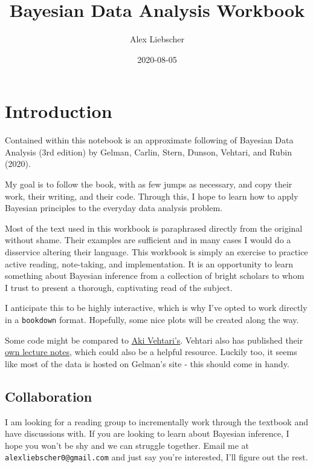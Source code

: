 \documentclass[]{book}
\title{Bayesian Data Analysis Workbook}
\author{Alex Liebscher}
\date{2020-08-05}
\begin{document}
\maketitle

{
\setcounter{tocdepth}{1}
\tableofcontents
}
\chapter{Introduction}\label{introduction}

Contained within this notebook is an approximate following of Bayesian
Data Analysis (3rd edition) by Gelman, Carlin, Stern, Dunson, Vehtari,
and Rubin (2020).

My goal is to follow the book, with as few jumps as necessary, and copy
their work, their writing, and their code. Through this, I hope to learn
how to apply Bayesian principles to the everyday data analysis problem.

Most of the text used in this workbook is paraphrased directly from the
original without shame. Their examples are sufficient and in many cases
I would do a disservice altering their language. This workbook is simply
an exercise to practice active reading, note-taking, and implementation.
It is an opportunity to learn something about Bayesian inference from a
collection of bright scholars to whom I trust to present a thorough,
captivating read of the subject.

I anticipate this to be highly interactive, which is why I've opted to
work directly in a \texttt{bookdown} format. Hopefully, some nice plots
will be created along the way.

Some code might be compared to
\href{https://github.com/avehtari/BDA_R_demos}{Aki Vehtari's}. Vehtari
also has published their
\href{https://github.com/avehtari/BDA_course_Aalto}{own lecture notes},
which could also be a helpful resource. Luckily too, it seems like most
of the data is hosted on Gelman's site - this should come in handy.

\section{Collaboration}\label{collaboration}

I am looking for a reading group to incrementally work through the
textbook and have discussions with. If you are looking to learn about
Bayesian inference, I hope you won't be shy and we can struggle
together. Email me at \texttt{alexliebscher0@gmail.com} and just say
you're interested, I'll figure out the rest.
\end{document}
